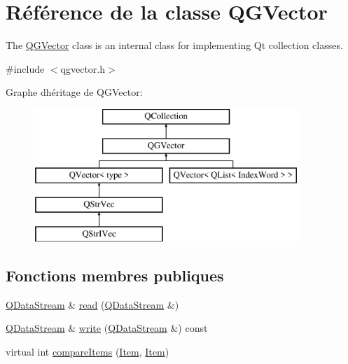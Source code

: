 \hypertarget{class_q_g_vector}{}\section{Référence de la classe Q\+G\+Vector}
\label{class_q_g_vector}


The \hyperlink{class_q_g_vector}{Q\+G\+Vector} class is an internal class for implementing Qt collection classes.  




{\ttfamily \#include $<$qgvector.\+h$>$}

Graphe d\textquotesingle{}héritage de Q\+G\+Vector\+:\begin{figure}[H]
\begin{center}
\leavevmode
\includegraphics[height=5.000000cm]{class_q_g_vector}
\end{center}
\end{figure}
\subsection*{Fonctions membres publiques}
\begin{DoxyCompactItemize}
\item 
\hyperlink{class_q_data_stream}{Q\+Data\+Stream} \& \hyperlink{class_q_g_vector_a9023b4232fc0b7bd6e8e14f5af5090d8}{read} (\hyperlink{class_q_data_stream}{Q\+Data\+Stream} \&)
\item 
\hyperlink{class_q_data_stream}{Q\+Data\+Stream} \& \hyperlink{class_q_g_vector_afa5b369ed1cb4752c59fc5c79b9bc1d8}{write} (\hyperlink{class_q_data_stream}{Q\+Data\+Stream} \&) const 
\item 
virtual int \hyperlink{class_q_g_vector_a65a79a6de037a4033ead55891622f5e2}{compare\+Items} (\hyperlink{class_q_collection_ac6f3ddbf999e31fb797927f71ae6b5d7}{Item}, \hyperlink{class_q_collection_ac6f3ddbf999e31fb797927f71ae6b5d7}{Item})
\end{DoxyCompactItemize}
